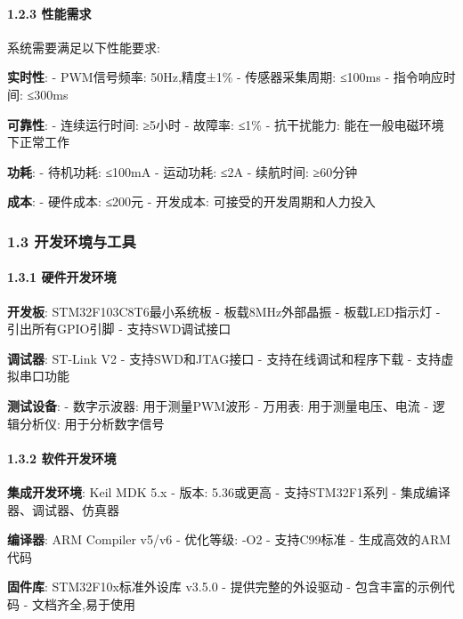 \documentclass[
]{article}
\begin{document}
\hypertarget{ux6027ux80fdux9700ux6c42}{%
\paragraph{1.2.3 性能需求}\label{ux6027ux80fdux9700ux6c42}}

系统需要满足以下性能要求:

\textbf{实时性}: - PWM信号频率: 50Hz,精度±1\% - 传感器采集周期: ≤100ms -
指令响应时间: ≤300ms

\textbf{可靠性}: - 连续运行时间: ≥5小时 - 故障率: ≤1\% - 抗干扰能力:
能在一般电磁环境下正常工作

\textbf{功耗}: - 待机功耗: ≤100mA - 运动功耗: ≤2A - 续航时间: ≥60分钟

\textbf{成本}: - 硬件成本: ≤200元 - 开发成本: 可接受的开发周期和人力投入

\hypertarget{ux5f00ux53d1ux73afux5883ux4e0eux5de5ux5177}{%
\subsubsection{1.3
开发环境与工具}\label{ux5f00ux53d1ux73afux5883ux4e0eux5de5ux5177}}

\hypertarget{ux786cux4ef6ux5f00ux53d1ux73afux5883}{%
\paragraph{1.3.1
硬件开发环境}\label{ux786cux4ef6ux5f00ux53d1ux73afux5883}}

\textbf{开发板}: STM32F103C8T6最小系统板 - 板载8MHz外部晶振 -
板载LED指示灯 - 引出所有GPIO引脚 - 支持SWD调试接口

\textbf{调试器}: ST-Link V2 - 支持SWD和JTAG接口 - 支持在线调试和程序下载
- 支持虚拟串口功能

\textbf{测试设备}: - 数字示波器: 用于测量PWM波形 - 万用表:
用于测量电压、电流 - 逻辑分析仪: 用于分析数字信号

\hypertarget{ux8f6fux4ef6ux5f00ux53d1ux73afux5883}{%
\paragraph{1.3.2
软件开发环境}\label{ux8f6fux4ef6ux5f00ux53d1ux73afux5883}}

\textbf{集成开发环境}: Keil MDK 5.x - 版本: 5.36或更高 - 支持STM32F1系列
- 集成编译器、调试器、仿真器

\textbf{编译器}: ARM Compiler v5/v6 - 优化等级: -O2 - 支持C99标准 -
生成高效的ARM代码

\textbf{固件库}: STM32F10x标准外设库 v3.5.0 - 提供完整的外设驱动 -
包含丰富的示例代码 - 文档齐全,易于使用
\end{document}
